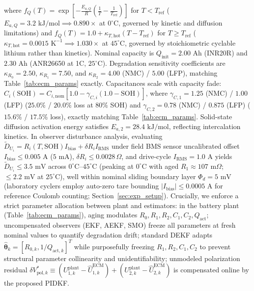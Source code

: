 \documentclass[preprint,12pt]{elsarticle}
\begin{document}
where $f_Q(T) = \exp[-\frac{E_{a,Q}}{R}(\frac{1}{T} - \frac{1}{T_{\text{ref}}})]$ for $T < T_{\text{ref}}$ ($E_{a,Q} = 3.2\text{ kJ/mol} \implies 0.890\times$ at $0^\circ\text{C}$, governed by kinetic and diffusion limitations) and $f_Q(T) = 1.0 + \kappa_{T,\text{hot}}(T - T_{\text{ref}})$ for $T \ge T_{\text{ref}}$ ($\kappa_{T,\text{hot}} = 0.0015\text{ K}^{-1} \implies 1.030\times$ at $45^\circ\text{C}$, governed by stoichiometric cyclable lithium rather than kinetics). Nominal capacity is $Q_{\text{init}} = 2.00\text{ Ah}$ (INR20R) and $2.30\text{ Ah}$ (ANR26650 at 1C, $25^\circ\text{C}$). Degradation sensitivity coefficients are $\kappa_{R_0} = 2.50$, $\kappa_{R_1} = 7.50$, and $\kappa_{R_2} = 4.00$ (NMC) / $5.00$ (LFP), matching Table~\ref{tab:ecm_params} exactly. Capacitances scale with capacity fade: $C_i(\text{SOH}) = C_{i,\text{nom}} [1.0 - \gamma_{C,i} (1.0 - \text{SOH})]$, where $\gamma_{C,1} = 1.25$ (NMC) / $1.00$ (LFP) ($25.0\%$ / $20.0\%$ loss at $80\%$ SOH) and $\gamma_{C,2} = 0.78$ (NMC) / $0.875$ (LFP) ($15.6\%$ / $17.5\%$ loss), exactly matching Table~\ref{tab:ecm_params}. Solid-state diffusion activation energy satisfies $E_{a,2} = 28.4\text{ kJ/mol}$, reflecting intercalation kinetics. In observer disturbance analysis, evaluating $\tilde{D}_{U_i} = R_i(T,\text{SOH}) I_{\text{bias}} + \delta R_i I_{\text{RMS}}$ under field BMS sensor uncalibrated offset $I_{\text{bias}} \le 0.005\text{ A}$ ($5\text{ mA}$), $\delta R_i \le 0.0028\,\Omega$, and drive-cycle $I_{\text{RMS}} = 1.0\text{ A}$ yields $\tilde{D}_{U_i} \le 3.5\text{ mV}$ across $0^\circ\text{C}\text{--}45^\circ\text{C}$ (peaking at $0^\circ\text{C}$ with aged $R_1 \approx 107\text{ m}\Omega$; $\le 2.2\text{ mV}$ at $25^\circ\text{C}$), well within nominal sliding boundary layer $\Phi_d = 5\text{ mV}$ (laboratory cyclers employ auto-zero tare bounding $|I_{\text{bias}}| \le 0.0005\text{ A}$ for reference Coulomb counting; Section~\ref{sec:exp_setup}). Crucially, we enforce a strict parameter allocation between plant and estimators: in the battery plant (Table~\ref{tab:ecm_params}), aging modulates $R_0, R_1, R_2, C_1, C_2, Q_{\text{act}}$; uncompensated observers (EKF, AEKF, SMO) freeze all parameters at fresh nominal values to quantify degradation drift; standard DEKF adapts $\hat{\boldsymbol{\theta}}_k = [R_{0,k}, 1/Q_{\text{act},k}]^T$ while purposefully freezing $R_1, R_2, C_1, C_2$ to prevent structural parameter collinearity and unidentifiability; unmodeled polarization residual $\delta V_{\text{pol},k}^* \equiv (U_{1,k}^{\text{plant}} - \hat{U}_{1,k}^{\text{ECM}}) + (U_{2,k}^{\text{plant}} - \hat{U}_{2,k}^{\text{ECM}})$ is compensated online by the proposed PIDKF.
\end{document}

